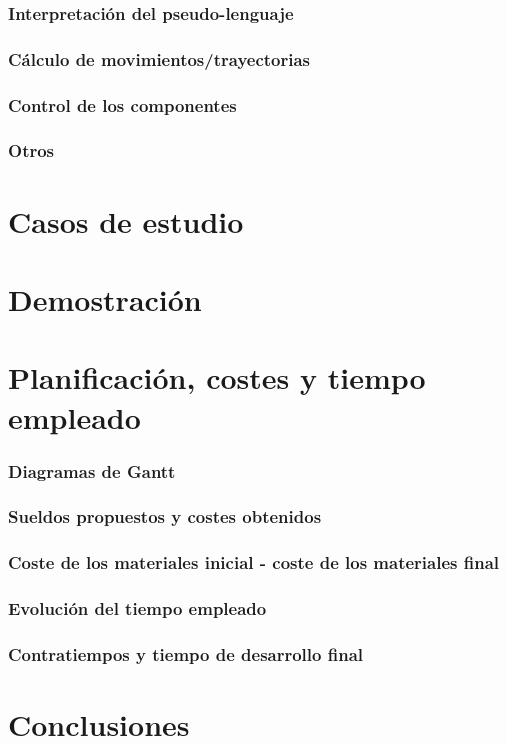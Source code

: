 \documentclass{article}
\begin{document}
\subsubsection{Interpretación del pseudo-lenguaje}
\subsubsection{Cálculo de movimientos/trayectorias}
\subsubsection{ Control de los componentes}
\subsubsection{Otros}
\section{Casos de estudio} %
\section{Demostración}
\section{Planificación, costes y tiempo empleado}
\subsubsection{Diagramas de Gantt}
\subsubsection{Sueldos propuestos y costes obtenidos}
\subsubsection{Coste de los materiales inicial - coste de los materiales final}
\subsubsection{Evolución del tiempo empleado}
\subsubsection{Contratiempos y tiempo de desarrollo final}
\section{Conclusiones}
\end{document}
